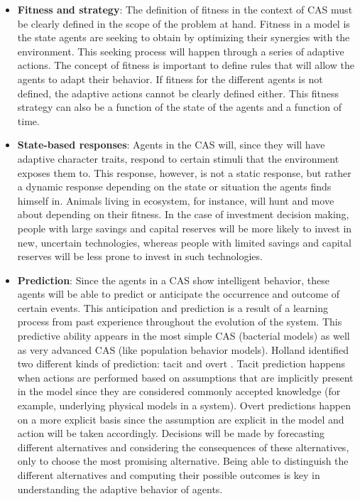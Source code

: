 \begin{itemize}
    \item \textbf{Fitness and strategy}: The definition of fitness in the context of CAS must be clearly defined in the scope of the problem at hand. Fitness in a model is the state agents are seeking to obtain by optimizing their synergies with the environment. This seeking process will happen through a series of adaptive actions. The concept of fitness is important to define rules that will allow the agents to adapt their behavior. If fitness for the different agents is not defined, the adaptive actions cannot be clearly defined either. This fitness strategy can also be a function of the state of the agents and a function of time.
    \item \textbf{State-based responses}: Agents in the CAS will, since they will have adaptive character traits, respond to certain stimuli that the environment exposes them to. This response, however, is not a static response, but rather a dynamic response depending on the state or situation the agents finds himself in. Animals living in ecosystem, for instance, will hunt and move about depending on their fitness. In the case of investment decision making, people with large savings and capital reserves will be more likely to invest in new, uncertain technologies, whereas people with limited savings and capital reserves will be less prone to invest in such technologies.
    \item \textbf{Prediction}: Since the agents in a CAS show intelligent behavior, these agents will be able to predict or anticipate the occurrence and outcome of certain events. This anticipation and prediction is a result of a learning process from past experience throughout the evolution of the system. This predictive ability appears in the most simple CAS (bacterial models) as well as very advanced CAS (like population behavior models). Holland identified two different kinds of prediction: tacit and overt \cite{CAS}. Tacit prediction happens when actions are performed based on assumptions that are implicitly present in the model since they are considered commonly accepted knowledge (for example, underlying physical models in a system). Overt predictions happen on a more explicit basis since the assumption are explicit in the model and action will be taken accordingly. Decisions will be made by forecasting different alternatives and considering the consequences of these alternatives, only to choose the most promising alternative. Being able to distinguish the different alternatives and computing their possible outcomes is key in understanding the adaptive behavior of agents. 

\end{itemize}
